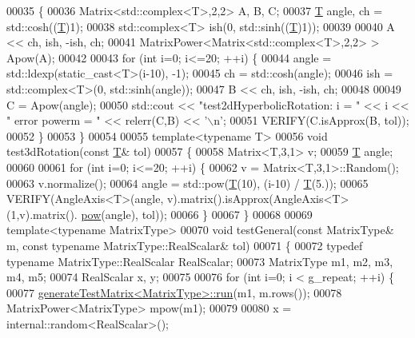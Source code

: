 \begin{DoxyCode}
00035 \{
00036   Matrix<std::complex<T>,2,2> A, B, C;
00037   \hyperlink{group___sparse_core___module_class_eigen_1_1_triplet}{T} angle, ch = std::cosh((\hyperlink{group___sparse_core___module_class_eigen_1_1_triplet}{T})1);
00038   std::complex<T> ish(0, std::sinh((\hyperlink{group___sparse_core___module_class_eigen_1_1_triplet}{T})1));
00039 
00040   A << ch, ish, -ish, ch;
00041   MatrixPower<Matrix<std::complex<T>,2,2> > Apow(A);
00042 
00043   \textcolor{keywordflow}{for} (\textcolor{keywordtype}{int} i=0; i<=20; ++i) \{
00044     angle = std::ldexp(static\_cast<T>(i-10), -1);
00045     ch = std::cosh(angle);
00046     ish = std::complex<T>(0, std::sinh(angle));
00047     B << ch, ish, -ish, ch;
00048 
00049     C = Apow(angle);
00050     std::cout << \textcolor{stringliteral}{"test2dHyperbolicRotation: i = "} << i << \textcolor{stringliteral}{"   error powerm = "} << relerr(C,B) << \textcolor{charliteral}{'\(\backslash\)n'};
00051     VERIFY(C.isApprox(B, tol));
00052   \}
00053 \}
00054 
00055 \textcolor{keyword}{template}<\textcolor{keyword}{typename} T>
00056 \textcolor{keywordtype}{void} test3dRotation(\textcolor{keyword}{const} \hyperlink{group___sparse_core___module_class_eigen_1_1_triplet}{T}& tol)
00057 \{
00058   Matrix<T,3,1> v;
00059   \hyperlink{group___sparse_core___module_class_eigen_1_1_triplet}{T} angle;
00060 
00061   \textcolor{keywordflow}{for} (\textcolor{keywordtype}{int} i=0; i<=20; ++i) \{
00062     v = Matrix<T,3,1>::Random();
00063     v.normalize();
00064     angle = std::pow(\hyperlink{group___sparse_core___module_class_eigen_1_1_triplet}{T}(10), (i-10) / \hyperlink{group___sparse_core___module_class_eigen_1_1_triplet}{T}(5.));
00065     VERIFY(AngleAxis<T>(angle, v).matrix().isApprox(AngleAxis<T>(1,v).matrix().
      \hyperlink{group___core___module_ab6dc101d82e8228a19a8840e3a29c1c9}{pow}(angle), tol));
00066   \}
00067 \}
00068 
00069 \textcolor{keyword}{template}<\textcolor{keyword}{typename} MatrixType>
00070 \textcolor{keywordtype}{void} testGeneral(\textcolor{keyword}{const} MatrixType& m, \textcolor{keyword}{const} \textcolor{keyword}{typename} MatrixType::RealScalar& tol)
00071 \{
00072   \textcolor{keyword}{typedef} \textcolor{keyword}{typename} MatrixType::RealScalar RealScalar;
00073   MatrixType m1, m2, m3, m4, m5;
00074   RealScalar x, y;
00075 
00076   \textcolor{keywordflow}{for} (\textcolor{keywordtype}{int} i=0; i < g\_repeat; ++i) \{
00077     \hyperlink{structgenerate_test_matrix}{generateTestMatrix<MatrixType>::run}(m1, m.rows());
00078     MatrixPower<MatrixType> mpow(m1);
00079 
00080     x = internal::random<RealScalar>();

\end{DoxyCode}
